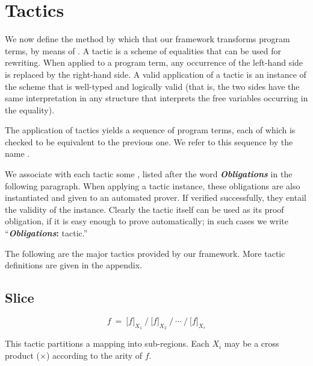 \section{Tactics}
\label{tactics}

We now define the method by which that our framework transforms program terms, by means of .
A tactic is a scheme of equalities that can be used for rewriting.
When applied to a program term, any occurrence of the left-hand side is replaced by the right-hand side.
A valid application of a tactic is an instance of the scheme that is well-typed and logically valid
(that is, the two sides have the same interpretation in any structure that interprets the free
variables occurring in the equality).

The application of tactics yields a sequence of program terms, each of which is checked to
be equivalent to the previous one. We refer to this sequence by the name .

We associate with each tactic some , listed after the word \textbf{\textit{Obligations}}
in the following paragraph.
When applying a tactic instance, these obligations are also instantiated and given to an automated prover. 
If verified successfully, they entail the validity of the instance. 
Clearly the tactic itself can be used as its proof obligation, if it is easy enough to prove automatically; 
in such cases we write ``\textbf{\textit{Obligations}:} tactic.''

The following are the major tactics provided by our framework. 
More tactic definitions are given in the appendix.

\newcommand\Obligations{\medskip\noindent\textbf{\textit{Obligations}:} }
\newcommand\reduce{\operatorname{reduce}}
\newcommand\listConcat{{\scriptstyle \,++\,}}

\theoremstyle{definition}
\newtheorem{tactic}{Tactic}

\newcommand\tacticdef[1]{\subsection*{\sf\larger #1}\vspace{-3mm}}

\tacticdef{Slice} \label{tactics:Slice}
\[f ~=~ \big[f\big]_{X_1} ~\Big/~ \big[f\big]_{X_2} ~\Big/ ~\cdots~ \Big/~ \big[f\big]_{X_r}\] 

This tactic partitions a mapping into sub-regions. Each $X_i$ may be a cross product ($\times$)
according to the arity of $f$.

